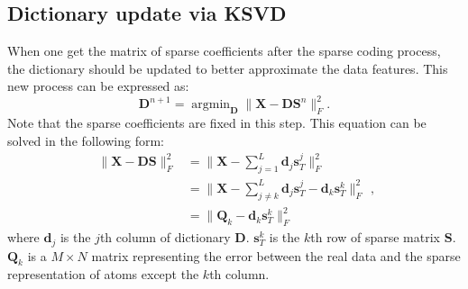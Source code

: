 \subsection{Dictionary update via KSVD}

When one get the matrix of sparse coefficients after the sparse coding process, the dictionary should be updated to better approximate the data features. This new process can be expressed as:
\begin{equation}
\mathbf{D}^{n+1}=\mathop{\text{argmin}}_{\mathbf{D}} \parallel \mathbf{X}-\mathbf{D}\mathbf{S}^{n} \parallel_{F}^{2}.
\end{equation}
Note that the sparse coefficients are fixed in this step. This equation can be solved in the following form:
\begin{equation}
\begin{aligned}
\parallel \mathbf{X}-\mathbf{D}\mathbf{S} \parallel_{F}^{2}&=\parallel \mathbf{X}-\sum_{j=1}^{L} \mathbf{d}_{j}\mathbf{s}_{T}^{j} \parallel_{F}^{2}\\
&=\parallel \mathbf{X}-\sum_{j\neq k}^{L} \mathbf{d}_{j}\mathbf{s}_{T}^{j}-\mathbf{d}_{k}\mathbf{s}_{T}^{k} \parallel_{F}^{2}\\
&=\parallel \mathbf{Q}_{k}-\mathbf{d}_{k}\mathbf{s}_{T}^{k} \parallel_{F}^{2}
\end{aligned},
\label{eq:ksvd}
\end{equation}
where $\mathbf{d}_{j}$ is the $j$th column of dictionary $\mathbf{D}$. $\mathbf{s}_{T}^{k}$ is the $k$th row of sparse matrix $\mathbf{S}$.  $\mathbf{Q}_{k}$ is a $M\times N$ matrix representing the error between the real data and the sparse representation of atoms except the $k$th column.

